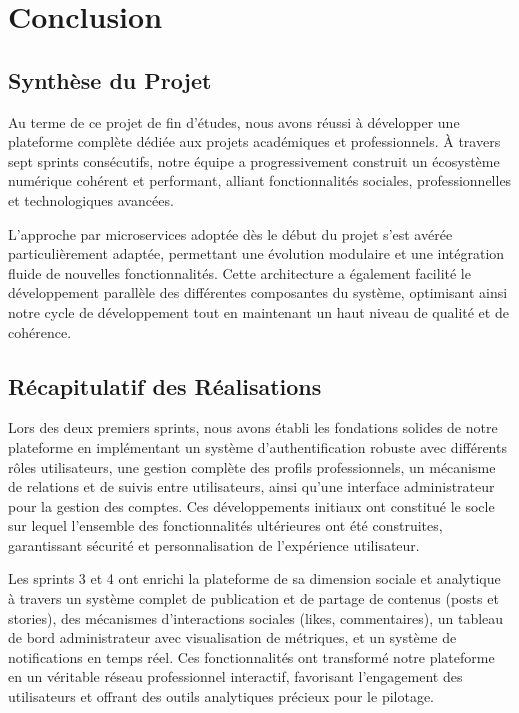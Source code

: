 \chapter*{Conclusion}

\minitoc

\section{Synthèse du Projet}
Au terme de ce projet de fin d'études, nous avons réussi à développer une plateforme complète dédiée aux projets académiques et professionnels. À travers sept sprints consécutifs, notre équipe a progressivement construit un écosystème numérique cohérent et performant, alliant fonctionnalités sociales, professionnelles et technologiques avancées.

L'approche par microservices adoptée dès le début du projet s'est avérée particulièrement adaptée, permettant une évolution modulaire et une intégration fluide de nouvelles fonctionnalités. Cette architecture a également facilité le développement parallèle des différentes composantes du système, optimisant ainsi notre cycle de développement tout en maintenant un haut niveau de qualité et de cohérence.

\section{Récapitulatif des Réalisations}
Lors des deux premiers sprints, nous avons établi les fondations solides de notre plateforme en implémentant un système d'authentification robuste avec différents rôles utilisateurs, une gestion complète des profils professionnels, un mécanisme de relations et de suivis entre utilisateurs, ainsi qu'une interface administrateur pour la gestion des comptes. Ces développements initiaux ont constitué le socle sur lequel l'ensemble des fonctionnalités ultérieures ont été construites, garantissant sécurité et personnalisation de l'expérience utilisateur.

Les sprints 3 et 4 ont enrichi la plateforme de sa dimension sociale et analytique à travers un système complet de publication et de partage de contenus (posts et stories), des mécanismes d'interactions sociales (likes, commentaires), un tableau de bord administrateur avec visualisation de métriques, et un système de notifications en temps réel. Ces fonctionnalités ont transformé notre plateforme en un véritable réseau professionnel interactif, favorisant l'engagement des utilisateurs et offrant des outils analytiques précieux pour le pilotage.

